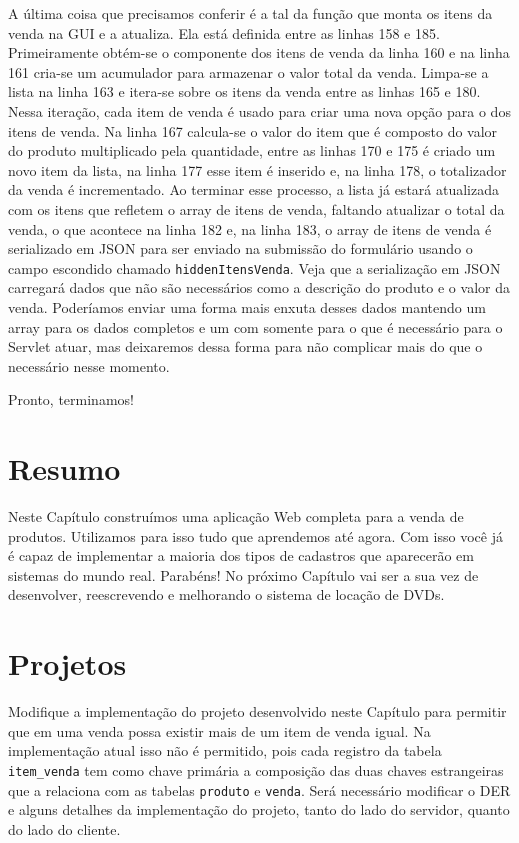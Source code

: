 A última coisa que precisamos conferir é a tal da função que monta os itens da venda na GUI e a atualiza. Ela está definida entre as linhas 158 e 185. Primeiramente obtém-se o componente dos itens de venda da linha 160 e na linha 161 cria-se um acumulador para armazenar o valor total da venda. Limpa-se a lista na linha 163 e itera-se sobre os itens da venda entre as linhas 165 e 180. Nessa iteração, cada item de venda é usado para criar uma nova opção para o  dos itens de venda. Na linha 167 calcula-se o valor do item que é composto do valor do produto multiplicado pela quantidade, entre as linhas 170 e 175 é criado um novo item da lista, na linha 177 esse item é inserido e, na linha 178, o totalizador da venda é incrementado. Ao terminar esse processo, a lista já estará atualizada com os itens que refletem o array de itens de venda, faltando atualizar o total da venda, o que acontece na linha 182 e, na linha 183, o array de itens de venda é serializado em JSON para ser enviado na submissão do formulário usando o campo escondido chamado \texttt{hiddenItensVenda}. Veja que a serialização em JSON carregará dados que não são necessários como a descrição do produto e o valor da venda. Poderíamos enviar uma forma mais enxuta desses dados mantendo um array para os dados completos e um com somente para o que é necessário para o Servlet atuar, mas deixaremos dessa forma para não complicar mais do que o necessário nesse momento.

Pronto, terminamos!


\section{Resumo}

Neste Capítulo construímos uma aplicação Web completa para a venda de produtos. Utilizamos para isso tudo que aprendemos até agora. Com isso você já é capaz de implementar a maioria dos tipos de cadastros que aparecerão em sistemas do mundo real. Parabéns! No próximo Capítulo vai ser a sua vez de desenvolver, reescrevendo e melhorando o sistema de locação de DVDs. 


\section{Projetos}

\begin{projetoSemArquivo}{}{}{}
    Modifique a implementação do projeto desenvolvido neste Capítulo para permitir que em uma venda possa existir mais de um item de venda igual. Na implementação atual isso não é permitido, pois cada registro da tabela \texttt{item\_venda} tem como chave primária a composição das duas chaves estrangeiras que a relaciona com as tabelas \texttt{produto} e \texttt{venda}. Será necessário modificar o DER e alguns detalhes da implementação do projeto, tanto do lado do servidor, quanto do lado do cliente.
\end{projetoSemArquivo}


